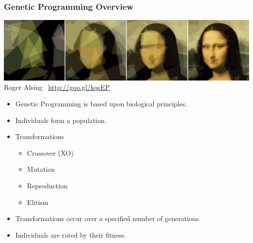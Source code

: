 \documentclass{beamer}
\begin{document}
\begin{frame}
  \frametitle{Genetic Programming Overview}
  \begin{center}
  \includegraphics[width=.60\textwidth]{mona_lisa.jpg} \\
  \tiny{Roger Alsing \ \url{http://goo.gl/kqsEP} }

  \end{center}
 
  \begin{itemize}
  	\item Genetic Programming is based upon biological principles.
	\item Individuals form a population.
	\item Transformations
		\begin{itemize}
		\item Crossover (XO)
		\item Mutation
		\item Reproduction
		\item Elitism
		\end{itemize}
	\item Transformations occur over a specified number of generations.
	\item Individuals are rated by their fitness.
  \end{itemize}
\end{frame}
\end{document}
